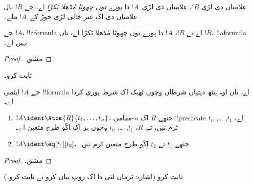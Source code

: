 \documentclass[../../../include/open-logic-section]{subfiles}
\begin{document}
\begin{defn}
علامتاں دی لڑی $!B$، علامتاں دی لڑی~$!A$ دا
\emph{پورے توں چھوٹا مُڈھلا ٹکڑا} اے، جے $!B$
نال علامتاں دی اک غیر خالی لڑی جوڑ کے~$!A$ ملے۔
\end{defn}

\begin{lem}
جے $!A$، !!a{formula} اے تے $!B$، $!A$ دا
پورے توں چھوٹا مُڈھلا ٹکڑا اے، تاں $!B$،
!!a{formula} نہیں اے۔
\end{lem}

\begin{proof}
مشق۔
\end{proof}

\begin{prob}
 ثابت کرو۔
\end{prob}

\begin{prop}
جے $!A$ ایٹمی !!{formula} اے، تاں اوہ ہیٹھ
دیتیاں شرطاں وچوں ٹھیک اک شرط پوری کردا اے۔
\begin{enumerate}
\item $!A \ident \Atom{R}{t_1,\dots,t_n}$، جتھے $R$ اک $n$-مقامی
  !!{predicate} اے، $t_1$, \dots, $t_n$ ٹرم نیں، تے $R$،
  $t_1$, \dots, $t_n$ وچوں ہر اک اکّو طرح متعین اے۔
\item $!A \ident \eq[t_1][t_2]$، جتھے $t_1$ تے $t_2$
  اکّو طرح متعین ٹرم نیں۔
\end{enumerate}
\end{prop}

\begin{proof}
مشق۔
\end{proof}

\begin{prob}
 ثابت کرو (اشارہ:
ٹرماں لئی  دا اک روپ
بیان کرو تے ثابت کرو۔)
\end{prob}
\end{document}
